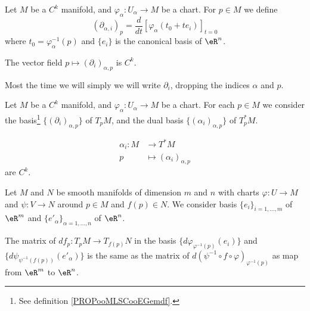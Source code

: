 \begin{propositionDef}		\label{PROPooMLSCooEGemdf}
	Let \( M\) be a \( C^k\) manifold, and \(\varphi_{\alpha} \colon U_{\alpha}\to M  \) be a chart. For \( p\in M\) we define
	\begin{equation}
		(\partial_{\alpha, i})_p=\frac{d}{dt} \left[ \varphi_{\alpha}(t_0+te_i)  \right]_{t=0}
	\end{equation}
	where \( t_0=\varphi_{\alpha}^{-1}(p)\) and \( \{ e_i \}\) is the canonical basis of \( \eR^n\).

	The vector field \( p\mapsto (\partial_i)_{\alpha,p}\) is \( C^k\).

	Most the time we will simply we will write \( \partial_i\), dropping the indices \( \alpha\) and \( p\).
\end{propositionDef}

\begin{propositionDef}		\label{PROPooGSTWooPvvwIF}
	Let \( M\) be a \( C^k\) manifold, and \(\varphi_{\alpha} \colon U_{\alpha}\to M  \) be a chart. For each \( p\in M\) we consider the basis\footnote{See definition \ref{PROPooMLSCooEGemdf}.} \( \{ (\partial_i)_{\alpha,p} \}\) of \( T_pM\), and the dual basis \( \{ (\alpha_i)_{\alpha,p} \}\) of \( T^*_pM\).

	\begin{equation}
		\begin{aligned}
			\alpha_i\colon M & \to T^*M                      \\
			p                & \mapsto (\alpha_i)_{\alpha,p}
		\end{aligned}
	\end{equation}
	are \( C^k\).
\end{propositionDef}


\begin{lemma}       \label{LEMooVCSJooEuDZFz}
	Let \( M\) and \( N\) be smooth manifolds of dimension \( m\) and \( n\) with charts \( \varphi\colon U\to M\) and \( \psi\colon V\to N\) around \( p\in M\) and \( f(p)\in N\). We consider basis \( \{ e_i \}_{i=1,\ldots, m}\) of \( \eR^m\) and \( \{ e'_{\alpha} \}_{\alpha=1,\ldots, n}\) of \( \eR^n\).

	The matrix of \( df_p\colon T_pM\to T_{f(p)}N\) in the basis \( \{ d\varphi_{\varphi^{-1}(p)}(e_i) \}\) and \( \{ d\psi_{\psi^{-1}(f(p))}(e'_{\alpha}) \}\) is the same as the matrix of \( d(\psi^{-1}\circ f\circ\varphi)_{\varphi^{-1}(p)}\) as map from \( \eR^m\) to \( \eR^n\).
\end{lemma}

